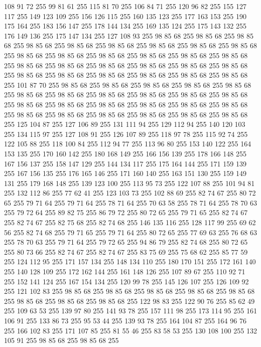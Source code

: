 108 91 72 255 99 81 61 255 115 81 70 255 106 84 71 255 120 96 82 255 155 127 117 255 149 123 109 255 156 126 115 255 160 135 123 255 177 163 153 255 190 175 164 255 183 156 147 255 178 144 134 255 169 135 124 255 175 143 132 255 176 149 136 255 175 147 134 255 127 108 93 255 98 85 68 255 98 85 68 255 98 85 68 255 98 85 68 255 98 85 68 255 98 85 68 255 98 85 68 255 98 85 68 255 98 85 68 255 98 85 68 255 98 85 68 255 98 85 68 255 98 85 68 255 98 85 68 255 98 85 68 255 98 85 68 255 98 85 68 255 98 85 68 255 98 85 68 255 98 85 68 255 98 85 68 255 98 85 68 255 98 85 68 255 98 85 68 255 98 85 68 255 98 85 68 255 98 85 68 255 101 87 70 255 98 85 68 255 98 85 68 255 98 85 68 255 98 85 68 255 98 85 68 255 98 85 68 255 98 85 68 255 98 85 68 255 98 85 68 255 98 85 68 255 98 85 68 255 98 85 68 255 98 85 68 255 98 85 68 255 98 85 68 255 98 85 68 255 98 85 68 255 98 85 68 255
98 85 68 255 98 85 68 255 98 85 68 255 98 85 68 255 98 85 68 255 125 104 87 255 127 106 89 255 131 111 94 255 129 112 94 255 140 120 103 255 134 115 97 255 127 108 91 255 126 107 89 255 118 97 78 255 115 92 74 255 122 105 88 255 118 100 84 255 112 94 77 255 113 96 80 255 153 140 122 255 164 153 135 255 170 160 142 255 180 168 149 255 166 156 139 255 178 166 148 255 167 156 137 255 158 147 129 255 144 134 117 255 175 164 144 255 171 159 139 255 167 156 135 255 176 165 146 255 171 160 140 255 163 151 130 255 159 149 131 255 179 168 148 255 139 123 100 255 113 95 73 255 122 107 88 255 101 94 81 255 132 112 86 255 77 62 41 255 123 103 73 255 102 88 69 255 82 74 67 255 80 72 65 255 79 71 64 255 79 71 64 255 78 71 64 255 70 63 58 255 78 71 64 255 78 70 63 255 79 72 64 255 89 82 75 255 86 79 72 255 80 72 65 255 79 71 65 255 82 74 67 255 82 74 67 255 82 75 68 255 82 74 68 255 146 135 116 255 128 117 99 255 69 62 56 255
82 74 68 255 79 71 65 255 79 71 64 255 80 72 65 255 77 69 63 255 76 68 63 255 78 70 63 255 79 71 64 255 79 72 65 255 94 86 79 255 82 74 68 255 80 72 65 255 80 73 66 255 82 74 67 255 82 74 67 255 83 75 69 255 75 68 62 255 85 77 59 255 124 112 95 255 171 157 134 255 148 134 110 255 180 170 151 255 172 161 140 255 140 128 109 255 172 162 144 255 161 148 126 255 107 89 67 255 110 92 71 255 152 141 124 255 167 154 134 255 120 99 78 255 145 126 107 255 126 109 92 255 121 102 83 255 98 85 68 255 98 85 68 255 98 85 68 255 98 85 68 255 98 85 68 255 98 85 68 255 98 85 68 255 98 85 68 255 122 98 83 255 122 90 76 255 85 62 49 255 109 63 53 255 139 97 80 255 141 93 78 255 157 111 98 255 173 114 95 255 161 106 91 255 133 86 73 255 95 53 44 255 139 93 78 255 164 104 87 255 164 96 76 255 166 102 83 255 171 107 85 255 81 55 46 255 83 58 53 255 130 108 100 255 132 105 91 255 98 85 68 255 98 85 68 255
